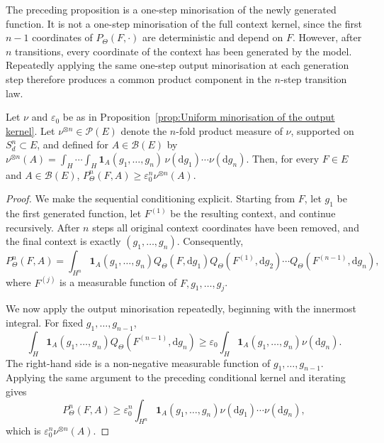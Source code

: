 The preceding proposition is a one-step minorisation of the newly generated function. It is not a one-step minorisation of the full context kernel, since the first \(n-1\) coordinates of \(P_\Theta(F,\cdot)\) are deterministic and depend on \(F\). However, after \(n\) transitions, every coordinate of the context has been generated by the model. Repeatedly applying the same one-step output minorisation at each generation step therefore produces a common product component in the \(n\)-step transition law.

\begin{proposition}\label{prop:Global n-step minorisation}
Let \(\nu\) and \(\varepsilon_0\) be as in Proposition~\ref{prop:Uniform minorisation of the output kernel}. Let \(\nu^{\otimes n}\in\mathcal P(E)\) denote the \(n\)-fold product measure of \(\nu\), supported on \(S_d^n\subset E\), and defined for \(A\in\mathcal B(E)\) by
\(
\nu^{\otimes n}(A)
=
\int_H\cdots\int_H
\mathbf 1_A(g_1,\ldots,g_n)\,
\nu(\mathrm dg_1)\cdots\nu(\mathrm dg_n).
\)
Then, for every \(F\in E\) and \(A\in\mathcal B(E)\),
\(
P_\Theta^n(F,A)
\geqslant
\varepsilon_0^n\nu^{\otimes n}(A).
\)
\end{proposition}

\begin{proof}
We make the sequential conditioning explicit. Starting from \(F\), let \(g_1\) be the first generated function, let \(F^{(1)}\) be the resulting context, and continue recursively. After \(n\) steps all original context coordinates have been removed, and the final context is exactly
\(
(g_1,\ldots,g_n).
\)
Consequently,
\[
P_\Theta^n(F,A)
=\int_{H^n}\mathbf 1_A(g_1,\ldots,g_n)
Q_\Theta(F,\mathrm dg_1)
Q_\Theta(F^{(1)},\mathrm dg_2)\cdots Q_\Theta(F^{(n-1)},\mathrm dg_n),
\]
where \(F^{(j)}\) is a measurable function of \(F,g_1,\ldots,g_j\).

We now apply the output minorisation repeatedly, beginning with the innermost integral. For fixed \(g_1,\ldots,g_{n-1}\),
\[
\int_H\mathbf 1_A(g_1,\ldots,g_n)
Q_\Theta(F^{(n-1)},\mathrm dg_n)
\geqslant
\varepsilon_0\int_H\mathbf 1_A(g_1,\ldots,g_n)\nu(\mathrm dg_n).
\]
The right-hand side is a non-negative measurable function of \(g_1,\ldots,g_{n-1}\). Applying the same argument to the preceding conditional kernel and iterating gives
\[
P_\Theta^n(F,A)
\geqslant\varepsilon_0^n
\int_{H^n}\mathbf 1_A(g_1,\ldots,g_n)
\nu(\mathrm dg_1)\cdots\nu(\mathrm dg_n),
\]
which is \(\varepsilon_0^n\nu^{\otimes n}(A)\).
\end{proof}

